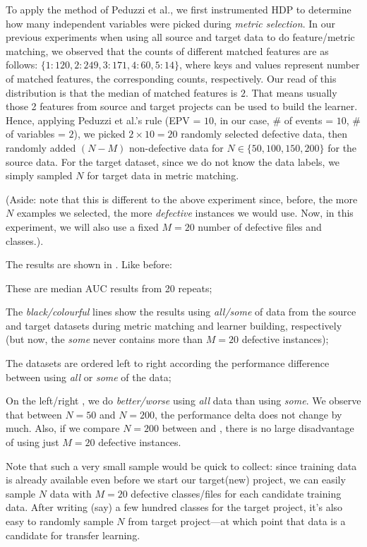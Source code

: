   To apply the method of Peduzzi et al., we first instrumented HDP to determine how many
  independent variables were picked during {\em metric  selection}. In our previous experiments when using all source and target data to do feature/metric matching, we observed that the counts of different matched features are as follows: $\{1:120, 2:249, 3:171, 4:60, 5:14\}$, where keys and values represent number of matched features, the corresponding counts, respectively. Our read of this distribution is that the median of matched features is $2$. That means usually those 2 features from source and target projects can be used to build the learner. Hence, applying  Peduzzi et al.'s rule (EPV = $10$,  in our case, \# of events = $10$, \# of variables = $2$), we picked $2\times 10=20$ %
  randomly selected defective data, then randomly added $(N-M)$ non-defective data for
  $N\in \{50,100,150,200\}$ for the source data. For the target dataset, since we do not
  know the data labels, we simply sampled $N$ for target data in metric matching.

  (Aside: note that this is different to the above experiment since, before, the more $N$ examples
  we selected, the more {\em defective} instances we would use. Now, in this experiment, we will also
  use a fixed $M=20$ number of defective files and classes.).

  The results are shown in . Like before:
\squishlist
  \item These are median AUC results from 20 repeats;
\item
  The {\em black/colourful} lines show the results using {\em all/some} of  data from
  the source and target datasets during metric matching and learner building, respectively
  (but now, the {\em some} never contains more than $M=20$ defective instances);
\item
  The datasets are ordered left to right according
  the performance difference between using
   {\em all} or {\em some} of the data;
   \item
     On the left/right ,  we do {\em better/worse} using
  {\em all} data than using {\em some}.
\squishend
  We observe that between $N=50$ and $N=200$, the performance delta
  does not change by much. Also, if we compare $N=200$ between 
  and , there is no large disadvantage of using just
  $M=20$ defective instances.

  Note that such a very small sample would be quick to collect: since training data is already available even before we start our target(new) project, we can easily sample $N$ data with $M=20$ defective classes/files for each candidate training data. After writing (say) a few
  hundred classes for the target project, it's also easy to randomly sample $N$ from target project---at which point that data is a candidate for transfer learning.
